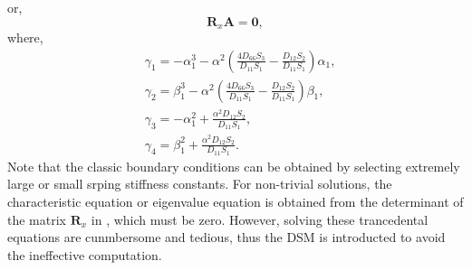 \documentclass[preprint,12pt]{elsarticle}
\begin{document}
%
or,
%
\begin{equation}\label{eq:ABx1}
		\mathbf{R}_x \mathbf{A} = \mathbf{0},
\end{equation}
%
where,
%
\begin{equation}\label{eq:gamma}
	\begin{split}
		&\gamma_1 = -\alpha_1^3 - \alpha^2 \left( \frac{4D_{66}S_3}{D_{11}S_1} - \frac{D_{12}S_2}{D_{11}S_1} \right) \alpha_1, \\
		&\gamma_2 = \beta_1^3 - \alpha^2 \left( \frac{4D_{66}S_3}{D_{11}S_1} - \frac{D_{12}S_2}{D_{11}S_1} \right) \beta_1, \\
		&\gamma_3 = -\alpha_1^2 + \frac{\alpha^2 D_{12} S_2}{D_{11} S_1}, \\
		&\gamma_4 = \beta_1^2 + \frac{\alpha^2 D_{12} S_2}{D_{11} S_1}.
	\end{split}
\end{equation}
%
Note that the classic boundary conditions can be obtained by selecting extremely large or small srping stiffness constants.
For non-trivial solutions, the characteristic equation or eigenvalue equation is obtained from the determinant of the matrix $\mathbf{R}_x$ in , which must be zero.
However, solving these trancedental equations are cunmbersome and tedious, thus the DSM is introducted to avoid the ineffective computation.
\end{document}
